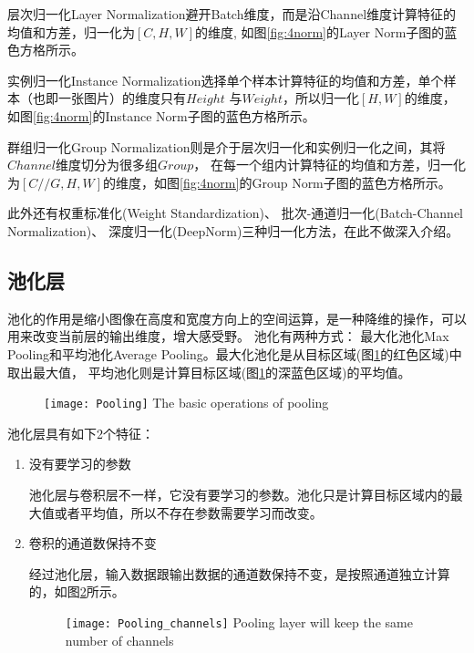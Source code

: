 层次归一化Layer Normalization避开Batch维度，而是沿Channel维度计算特征的均值和方差，归一化为$[C, H, W]$的维度,
如图\ref{fig:4norm}的Layer Norm子图的蓝色方格所示。

实例归一化Instance Normalization选择单个样本计算特征的均值和方差，单个样本（也即一张图片）的维度只有$Height$
与$Weight$，所以归一化$[H, W]$的维度，如图\ref{fig:4norm}的Instance Norm子图的蓝色方格所示。

群组归一化Group Normalization则是介于层次归一化和实例归一化之间，其将$Channel$维度切分为很多组$Group$，
在每一个组内计算特征的均值和方差，归一化为$[C//G, H, W]$的维度，如图\ref{fig:4norm}的Group Norm子图的蓝色方格所示。

此外还有权重标准化(Weight Standardization\cite{Qiao2019WeightS})、 
批次-通道归一化(Batch-Channel Normalization\cite{Qiao2019RethinkingNA})、
深度归一化(DeepNorm\cite{Zare2017DeepNormADL})三种归一化方法，在此不做深入介绍。

\subsection{池化层}
池化的作用是缩小图像在高度和宽度方向上的空间运算，是一种降维的操作，可以用来改变当前层的输出维度，增大感受野。 池化有两种方式：
最大化池化Max Pooling和平均池化Average Pooling。最大化池化是从目标区域(图\ref{fig:pooling}的红色区域)中取出最大值，
平均池化则是计算目标区域(图\ref{fig:pooling}的深蓝色区域)的平均值。
\begin{figure}[!htp]
    \centering
    \texttt{[image: Pooling]}
        {The basic operations of pooling}
    \label{fig:pooling}
\end{figure}

池化层具有如下2个特征：
\begin{enumerate}
    \item {\heiti 没有要学习的参数}
    
    池化层与卷积层不一样，它没有要学习的参数。池化只是计算目标区域内的最大值或者平均值，所以不存在参数需要学习而改变。
    \item {\heiti 卷积的通道数保持不变}
    
    经过池化层，输入数据跟输出数据的通道数保持不变，是按照通道独立计算的，如图\ref{fig:keep_same_channel}所示。
    \begin{figure}[h]
        \centering
        \texttt{[image: Pooling\_channels]}
        	{Pooling layer will keep the same number of channels}
		 \label{fig:keep_same_channel}
    \end{figure}
\end{enumerate}


